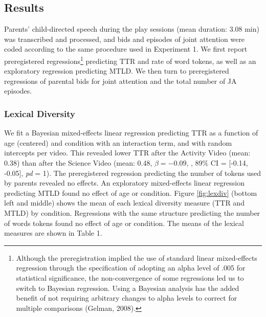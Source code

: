 \documentclass[man,floatsintext]{apa6}
\begin{document}
\hypertarget{results-1}{%
\subsection{Results}\label{results-1}}

Parents' child-directed speech during the play sessions (mean duration: 3.08 min) was transcribed and processed, and bids and episodes of joint attention were coded according to the same procedure used in Experiment 1.
We first report preregistered regressions\footnote{Although the preregistration implied the use of standard linear mixed-effects regression through the specification of adopting an alpha level of .005 for statistical significance, the non-convergence of some regressions led us to switch to Bayesian regression. Using a Bayesian analysis has the added benefit of not requiring arbitrary changes to alpha levels to correct for multiple comparisons (Gelman, 2008).} predicting TTR and rate of word tokens, as well as an exploratory regression predicting MTLD.
We then turn to preregistered regressions of parental bids for joint attention and the total number of JA episodes.

\hypertarget{lexical-diversity-1}{%
\subsubsection{Lexical Diversity}\label{lexical-diversity-1}}

We fit a Bayesian mixed-effects linear regression predicting TTR as a function of age (centered) and condition with an interaction term, and with random intercepts per video.
This revealed lower TTR after the Activity Video (mean: 0.38) than after the Science Video (mean: 0.48, \(\beta=-0.09\), , 89\% CI = {[}-0.14, -0.05{]}, \emph{pd} = 1).
The preregistered regression predicting the number of tokens used by parents revealed no effects.
An exploratory mixed-effects linear regression predicting MTLD found no effect of age or condition.
Figure \ref{fig:lexdiv} (bottom left and middle) shows the mean of each lexical diversity measure (TTR and MTLD) by condition.
Regressions with the same structure predicting the number of words tokens found no effect of age or condition.
The means of the lexical measures are shown in Table 1.
\end{document}
